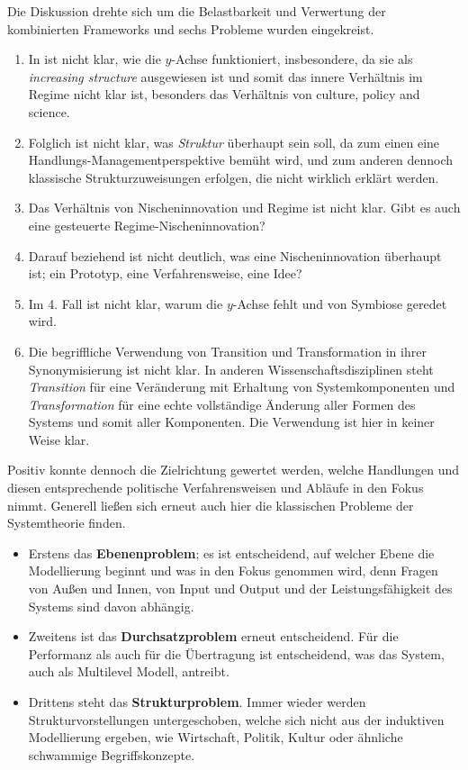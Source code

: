 \documentclass[11pt,a4paper]{article}
\begin{document}
Die Diskussion drehte sich um die Belastbarkeit und Verwertung der
kombinierten Frameworks und sechs Probleme wurden eingekreist.
\begin{enumerate}[noitemsep]
\item In \cite {Geels2007} ist nicht klar, wie die $y$-Achse funktioniert,
  insbesondere, da sie als \emph{increasing structure} ausgewiesen ist und
  somit das innere Verhältnis im Regime nicht klar ist, besonders das
  Verhältnis von culture, policy and science.
\item Folglich ist nicht klar, was \emph{Struktur} überhaupt sein soll, da zum
  einen eine Handlungs-Managementperspektive bemüht wird, und zum anderen
  dennoch klassische Strukturzuweisungen erfolgen, die nicht wirklich erklärt
  werden.
\item Das Verhältnis von Nischeninnovation und Regime ist nicht klar. Gibt es
  auch eine gesteuerte Regime-Nischeninnovation?
\item Darauf beziehend ist nicht deutlich, was eine Nischeninnovation
  überhaupt ist; ein Prototyp, eine Verfahrensweise, eine Idee?
\item Im 4. Fall ist nicht klar, warum die $y$-Achse fehlt und von Symbiose
  geredet wird.
\item Die begriff\-liche Verwendung von Transition und Transformation in ihrer
  Synonymisierung ist nicht klar. In anderen Wissenschaftsdisziplinen steht
  \emph{Transition} für eine Veränderung mit Erhaltung von Systemkomponenten
  und \emph{Transformation} für eine echte vollständige Änderung aller Formen
  des Systems und somit aller Komponenten. Die Verwendung ist hier in keiner
  Weise klar.
\end{enumerate}

Positiv konnte dennoch die Zielrichtung gewertet werden, welche Handlungen und
diesen entsprechende politische Verfahrensweisen und Abläufe in den Fokus
nimmt. Generell ließen sich erneut auch hier die klassischen Probleme der
Systemtheorie finden. 
\begin{itemize}[noitemsep]
\item Erstens das \textbf{Ebenenproblem}; es ist entscheidend, auf welcher
  Ebene die Modellierung beginnt und was in den Fokus genommen wird, denn
  Fragen von Außen und Innen, von Input und Output und der Leistungsfähigkeit
  des Systems sind davon abhängig.
\item Zweitens ist das \textbf{Durchsatzproblem} erneut entscheidend. Für die
  Performanz als auch für die Übertragung ist entscheidend, was das System,
  auch als Multilevel Modell, antreibt.
\item Drittens steht das \textbf{Strukturproblem}. Immer wieder werden
  Strukturvorstellungen untergeschoben, welche sich nicht aus der induktiven
  Modellierung ergeben, wie Wirtschaft, Politik, Kultur oder ähnliche
  schwammige Begriffskonzepte.
\end{itemize}
\end{document}
